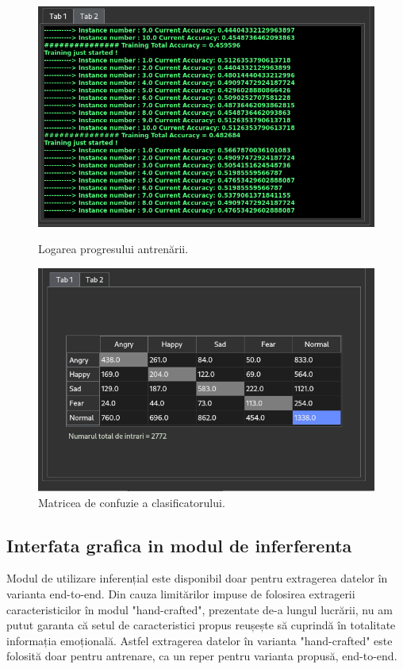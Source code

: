 \documentclass[a4paper,12pt]{book}
\begin{document}
		\begin{figure}[h]
			\hspace{-1.2cm}
			\begin{minipage}{0.48\textwidth}
				\centering
				\includegraphics[scale=0.40]{gui_train_logs}
				\caption{Logarea progresului antrenării.}\label{Fig:gui_train_logs}
			\end{minipage}\hfill
		\hspace{1.9cm}
			\begin{minipage}{0.60\textwidth}
				\centering
				\includegraphics[scale=0.383]{gui_train_tabel}
				\caption{Matricea de confuzie a clasificatorului.}\label{Fig:gui_train_table}
			\end{minipage}
		\end{figure} 
		\subsection{Interfata grafica in modul de inferferenta}
		Modul de utilizare inferențial este disponibil doar pentru extragerea datelor în varianta end-to-end. Din cauza limitărilor impuse de folosirea extragerii caracteristicilor în modul "hand-crafted", prezentate de-a lungul lucrării, nu am putut garanta că setul de caracteristici propus reușește să cuprindă în totalitate informația emoțională. Astfel extragerea datelor în varianta "hand-crafted" este folosită doar pentru antrenare, ca un reper pentru varianta propusă, end-to-end. \par
		
\end{document}
